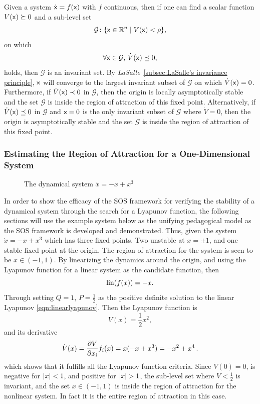 \begin{theorem}
  Given a system \(\dot{{\mathbf{\mathsf{x}}}} = f({\mathbf{\mathsf{x}}})\) with \(f\) continuous, then if
  one can find a scalar function \(V({\mathbf{\mathsf{x}}}) \succeq 0 \) and a sub-level set
  \[
    \mathcal{G} \colon \lbrace{\mathbf{\mathsf{x}}} \in \mathbb{R}^n \mid V({\mathbf{\mathsf{x}}}) < \rho\rbrace,
  \]
  on which
  \[
    \forall {\mathbf{\mathsf{x}}} \in \mathcal{G},\,\dot{V}({\mathbf{\mathsf{x}}}) \preceq 0,
  \]
  holds, then \(\mathcal{G}\) is an invariant set. By
  \textit{LaSalle}~\ref{subsec:LaSalle's invariance principle}, \({\mathbf{\mathsf{x}}}\)
  will converge to the largest invariant subset of \(\mathcal{G}\) on which
  \(\dot{V}({\mathbf{\mathsf{x}}}) = 0\). Furthermore, if \(\dot{V}({\mathbf{\mathsf{x}}}) \prec 0\) in
  \(\mathcal{G}\), then the origin is locally asymptotically stable and the set
  \(\mathcal{G}\) is inside the region of attraction of this fixed point.
  Alternatively, if \(\dot{V}({\mathbf{\mathsf{x}}}) \preceq 0 \) in \(\mathcal{G}\) and
  \({\mathbf{\mathsf{x}}} = 0\) is the only invariant subset of \(\mathcal{G}\) where
  \(\dot{V} = 0\), then the origin is asymptotically stable and the set
  \(\mathcal{G}\) is inside the region of attraction of this fixed point.
\end{theorem}

\subsubsection{Estimating the Region of Attraction for a One-Dimensional System}
\label{subsec:Estimating the region of attraction for a one-dimensional system}

\begin{figure}
  \centering 
  \caption[A visualization of the dynamical system \(\dot{x} = -x + x^3\)]{The
    dynamical system \(\dot{x} = -x + x^3\)}
\end{figure}

In order to show the efficacy of the \ac{SOS} framework for verifying the
stability of a dynamical system through the search for a Lyapunov function, the
following sections will use the example system below as the unifying pedagogical
model as the \ac{SOS} framework is developed and demonstrated. Thus, given the
system \(\dot{x} = -x + x^3\) which has three fixed points. Two unstable at \(x
= \pm 1\), and one stable fixed point at the origin. The region of attraction
for the system is seen to be \(x \in \left( -1, 1 \right)\). By linearizing the
dynamics around the origin, and using the Lyapunov function for a linear system
as the candidate function, then
\[
  \operatorname{lin}(f(x)) = -x.
\]
Through setting \(Q=1\), \(P=\frac{1}{2}\) as the positive definite solution to
the linear Lyapunov \cref{eqn:linearlyapunov}. Then the Lyapunov function is
\[
  V(x) = \frac{1}{2}x^2,
\]
and its derivative
\[
  \dot{V}(x) = \frac{\partial V}{\partial x_i} f_i(x) = x(-x + x^3) = -x^2 +
  x^4 \, .
\]
which shows that it fulfills all the Lyapunov function criteria. Since
\(\dot{V}(0) = 0\), is negative for \(\lvert x\rvert<1\), and positive for \(\lvert x\rvert >
1\), the sub-level set where \(V < \frac{1}{2}\) is invariant, and the set \(x
\in \left( -1, 1 \right)\) is inside the region of attraction for the nonlinear
system. In fact it is the entire region of attraction in this case.

